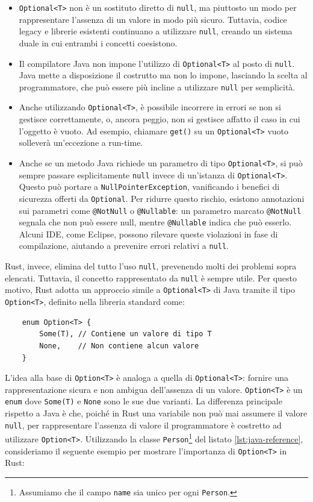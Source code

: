 \begin{itemize}
    \item \texttt{Optional<T>} non è un sostituto diretto di \texttt{null}, ma piuttosto un modo per rappresentare l'assenza di un valore in modo più sicuro. Tuttavia, codice legacy e librerie esistenti continuano a utilizzare \texttt{null}, creando un sistema duale in cui entrambi i concetti coesistono.
    \item Il compilatore Java non impone l'utilizzo di \texttt{Optional<T>} al posto di \texttt{null}. Java mette a disposizione il costrutto ma non lo impone, lasciando la scelta al programmatore, che può essere più incline a utilizzare \texttt{null} per semplicità.
    \item Anche utilizzando \texttt{Optional<T>}, è possibile incorrere in errori se non si gestisce correttamente, o, ancora peggio, non si gestisce affatto il caso in cui l'oggetto è vuoto. Ad esempio, chiamare \texttt{get()} su un \texttt{Optional<T>} vuoto solleverà un'eccezione a run-time. 
        \item Anche se un metodo Java richiede un parametro di tipo \texttt{Optional<T>}, si può sempre passare esplicitamente \texttt{null} invece di un'istanza di \texttt{Optional<T>}. Questo può portare a \texttt{NullPointerException}, vanificando i benefici di sicurezza offerti da \texttt{Optional}. Per ridurre questo rischio, esistono annotazioni sui parametri come \texttt{@NotNull} o \texttt{@Nullable}: un parametro marcato \texttt{@NotNull} segnala che non può essere null, mentre \texttt{@Nullable} indica che può esserlo. Alcuni IDE, come Eclipse, possono rilevare queste violazioni in fase di compilazione, aiutando a prevenire errori relativi a \texttt{null}.
\end{itemize}
Rust, invece, elimina del tutto l'uso \texttt{null}, prevenendo molti dei problemi sopra elencati. Tuttavia, il concetto rappresentato da \texttt{null} è sempre utile. Per questo motivo, Rust adotta un approccio simile a \texttt{Optional<T>} di Java tramite il tipo \texttt{Option<T>}, definito nella libreria standard come:
\begin{verbatim}
    enum Option<T> {
        Some(T), // Contiene un valore di tipo T
        None,    // Non contiene alcun valore
    }
\end{verbatim}
L'idea alla base di \texttt{Option<T>} è analoga a quella di \texttt{Optional<T>}: fornire una rappresentazione sicura e non ambigua dell'assenza di un valore. \texttt{Option<T>} è un \texttt{enum} dove \texttt{Some(T)} e \texttt{None} sono le sue due varianti. La differenza principale rispetto a Java è che, poiché in Rust una variabile non può mai assumere il valore \texttt{null}, per rappresentare l'assenza di valore il programmatore è costretto ad utilizzare \texttt{Option<T>}. Utilizzando la classe \texttt{Person}\footnote{Assumiamo che il campo \texttt{name} sia unico per ogni \texttt{Person}.} del listato \ref{lst:java-reference}, consideriamo il seguente esempio per mostrare l'importanza di \texttt{Option<T>} in Rust: 
